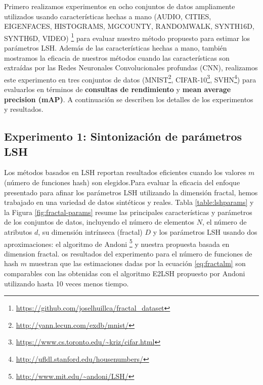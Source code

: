 Primero realizamos experimentos en ocho conjuntos de datos ampliamente utilizados usando características hechas a mano (AUDIO, CITIES, EIGENFACES, HISTOGRAMS, MGCOUNTY, RANDOMWALK, SYNTH16D, SYNTH6D, VIDEO) \footnote{\url{https://github.com/joselhuillca/fractal_dataset}} para evaluar nuestro método propuesto para estimar los parámetros LSH. Además de las características hechas a mano, también mostramos la eficacia de nuestros métodos cuando las características son extraídas por las Redes Neuronales Convolucionales profundas (CNN), realizamos este experimento en tres conjuntos de datos (MNIST\footnote{\url{http://yann.lecun.com/exdb/mnist/}}, CIFAR-10\footnote{\url{https://www.cs.toronto.edu/~kriz/cifar.html}}, SVHN\footnote{\url{http://ufldl.stanford.edu/housenumbers/}}) para evaluarlos en términos de \textbf{consultas de rendimiento} y \textbf{mean average precision (mAP)}. A continuación se describen los detalles de los experimentos y resultados.

\subsection{Experimento 1: Sintonización de parámetros LSH}

Los métodos basados en LSH reportan resultados eficientes cuando los valores $m$ (número de funciones hash) son elegidos.Para evaluar la eficacia del enfoque presentado para afinar los parámetros LSH utilizando la dimensión fractal, hemos trabajado en una variedad de datos sintéticos y reales. Tabla \ref{table:lshparams} y la Figura \ref{fig:fractal-params} resume las principales características y parámetros de los conjuntos de datos, incluyendo el número de elementos $N$, el número de atributos $d$, su dimensión intrínseca (fractal) $D$ y los parámetros LSH usando dos aproximaciones: el algoritmo de Andoni \footnote{\url{http://www.mit.edu/~andoni/LSH/}}  y nuestra propuesta basada en dimension fractal.  os resultados del experimento para el número de funciones de hash $m$ muestran que las estimaciones dadas por la ecuación \ref{eq:fractalm} son comparables con las obtenidas con el algoritmo E2LSH propuesto por Andoni utilizando hasta 10 veces menos tiempo.
 

